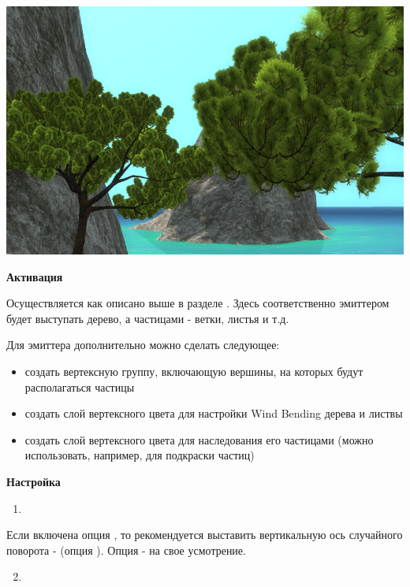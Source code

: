 \documentclass[a4paper,12pt,oneside]{sphinxmanual}
\begin{document}
{\hfill\includegraphics[width=1.000\linewidth]{tree_leaves.jpg}\hfill}

\begin{DUlineblock}{0em}
\item[] 
\end{DUlineblock}

\textbf{Активация}

Осуществляется как описано выше в разделе . Здесь соответственно эмиттером будет выступать дерево, а частицами - ветки, листья и т.д.

Для эмиттера дополнительно можно сделать следующее:
\begin{itemize}
\item {} 
создать вертексную группу, включающую вершины, на которых будут располагаться частицы

\item {} 
создать слой вертексного цвета для настройки Wind Bending дерева и листвы

\item {} 
создать слой вертексного цвета для наследования его частицами (можно использовать, например, для подкраски частиц)

\end{itemize}

\textbf{Настройка}
\begin{enumerate}
\item {} 

\end{enumerate}

Если включена опция , то рекомендуется выставить вертикальную ось случайного поворота -  (опция ). Опция  - на свое усмотрение.
\begin{enumerate}
\setcounter{enumi}{1}
\item {} 

\end{enumerate}
\end{document}
